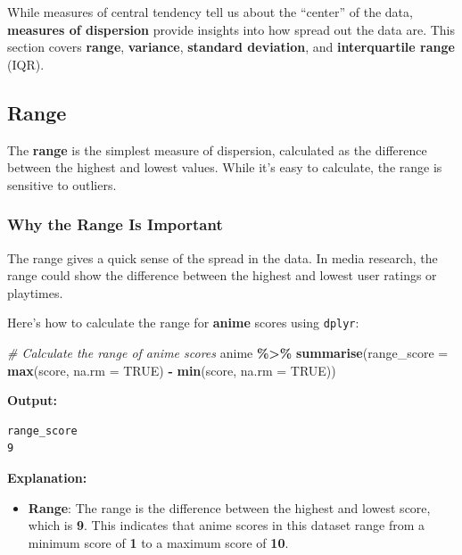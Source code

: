 \documentclass[
]{book}
\newenvironment{Shaded}{\begin{snugshade}}{\end{snugshade}}
\newcommand{\AttributeTok}[1]{\textcolor[rgb]{0.13,0.29,0.53}{#1}}
\newcommand{\CommentTok}[1]{\textcolor[rgb]{0.56,0.35,0.01}{\textit{#1}}}
\newcommand{\ConstantTok}[1]{\textcolor[rgb]{0.56,0.35,0.01}{#1}}
\newcommand{\FunctionTok}[1]{\textcolor[rgb]{0.13,0.29,0.53}{\textbf{#1}}}
\newcommand{\NormalTok}[1]{#1}
\newcommand{\SpecialCharTok}[1]{\textcolor[rgb]{0.81,0.36,0.00}{\textbf{#1}}}
\providecommand{\tightlist}{%
  \setlength{\itemsep}{0pt}\setlength{\parskip}{0pt}}
\begin{document}
While measures of central tendency tell us about the ``center'' of the data, \textbf{measures of dispersion} provide insights into how spread out the data are. This section covers \textbf{range}, \textbf{variance}, \textbf{standard deviation}, and \textbf{interquartile range} (IQR).

\subsection*{Range}\label{range}

The \textbf{range} is the simplest measure of dispersion, calculated as the difference between the highest and lowest values. While it's easy to calculate, the range is sensitive to outliers.

\subsubsection*{Why the Range Is Important}\label{why-the-range-is-important}

The range gives a quick sense of the spread in the data. In media research, the range could show the difference between the highest and lowest user ratings or playtimes.

Here's how to calculate the range for \textbf{anime} scores using \texttt{dplyr}:

\begin{Shaded}
\begin{Highlighting}[]
\CommentTok{\# Calculate the range of anime scores}
\NormalTok{anime }\SpecialCharTok{\%\textgreater{}\%}
  \FunctionTok{summarise}\NormalTok{(}\AttributeTok{range\_score =} \FunctionTok{max}\NormalTok{(score, }\AttributeTok{na.rm =} \ConstantTok{TRUE}\NormalTok{) }\SpecialCharTok{{-}} \FunctionTok{min}\NormalTok{(score, }\AttributeTok{na.rm =} \ConstantTok{TRUE}\NormalTok{))}
\end{Highlighting}
\end{Shaded}

\textbf{Output:}

\begin{verbatim}
range_score
9
\end{verbatim}

\textbf{Explanation:}

\begin{itemize}
\tightlist
\item
  \textbf{Range}: The range is the difference between the highest and lowest score, which is \textbf{9}. This indicates that anime scores in this dataset range from a minimum score of \textbf{1} to a maximum score of \textbf{10}.
\end{itemize}
\end{document}
